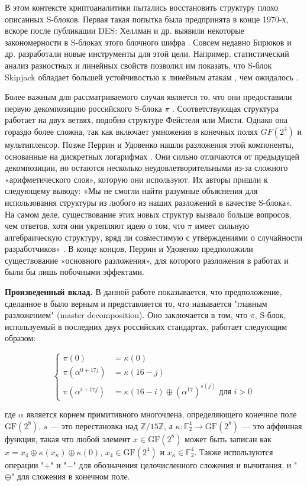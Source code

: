 В этом контексте криптоаналитики пытались восстановить структуру плохо описанных S-блоков. Первая такая попытка была предпринята в конце 1970-х, вскоре после публикации DES: Хеллман и др. выявили некоторые закономерности в S-блоках этого блочного шифра \cite{HMS76}. Совсем недавно Бирюков и др. разработали новые инструменты для этой цели. Например, статистический анализ разностных и линейных свойств позволил им показать, что S-блок Skipjack обладает большей устойчивостью к линейным атакам \cite{Mat94}, чем ожидалось \cite{BP15}.

Более важным для рассматриваемого случая является то, что они предоставили первую декомпозицию российского S-блока \(\pi\) \cite{BPU16a, BPU16b}. Соответствующая структура работает на двух ветвях, подобно структуре Фейстеля или Мисти. Однако она гораздо более сложна, так как включает умножения в конечных полях \(GF(2^4)\) и мультиплексор. Позже Перрин и Удовенко нашли разложения этой компоненты, основанные на дискретных логарифмах \cite{PU16}. Они сильно отличаются от предыдущей декомпозиции, но остаются несколько неудовлетворительными из-за сложного «арифметического слоя», которую они используют. Их авторы пришли к следующему выводу: «Мы не смогли найти разумные объяснения для использования структуры из любого из наших разложений в качестве S-блока». На самом деле, существование этих новых структур вызвало больше вопросов, чем ответов, хотя они укрепляют идею о том, что \(\pi\) имеет сильную алгебраическую структуру, вряд ли совместимую с утверждениями о случайности разработчиков» \cite{PU16}. В конце концов, Перрин и Удовенко предположили существование «основного разложения», для которого разложения в работах \cite{BPU16a} и \cite{PU16} были бы лишь побочными эффектами.

\textbf{Произведенный вклад.} В данной работе показывается, что предположение, сделанное в \cite{PU16} было верным и представляется то, что называется "главным разложением" (master decomposition). Оно заключается в том, что \(\pi\), S-блок, используемый в последних двух российских стандартах, работает следующим образом:

$$
\begin{cases}\pi(0) & =\kappa(0) \\ \pi\left(\alpha^{0+17 j}\right) & =\kappa(16-j) \\ \pi\left(\alpha^{i+17 j}\right) & =\kappa(16-i) \oplus\left(\alpha^{17}\right)^{s(j)} \text { для } i>0\end{cases}
$$

где \(\alpha\) является корнем примитивного многочлена, определяющего конечное поле \(\text{GF}(2^8)\), \(s\) — это перестановка над \( \mathbb{Z}/15\mathbb{Z} \), а \(\kappa: \mathbb{F}_2^4 \to \text{GF}(2^8)\) — это аффинная функция, такая что любой элемент \(x \in \text{GF}(2^8)\) может быть записан как \(x = x_4 \oplus \kappa(x_\kappa) \oplus \kappa(0)\), \(x_4 \in \text{GF}(2^4)\) и \(x_\kappa \in \mathbb{F}_2^4\). Также используются операции "$+$" и "$-$" для обозначения целочисленного сложения и вычитания, и "$\oplus$" для сложения в конечном поле.

